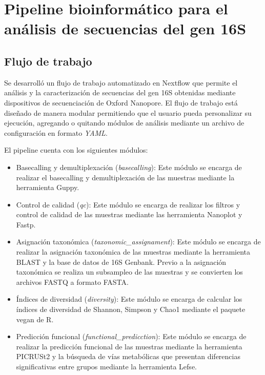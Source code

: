 \chapter{Pipeline bioinformático para el análisis de secuencias del gen 16S}

\section{Flujo de trabajo}
Se desarrolló un flujo de trabajo automatizado en Nextflow que permite el análisis y la caracterización de secuencias del gen 16S obtenidas mediante dispositivos de secuenciación de Oxford Nanopore. 
El flujo de trabajo está diseñado de manera modular permitiendo que el usuario pueda personalizar su ejecución, agregando o quitando módulos de análisis mediante un archivo de configuración en formato \textit{YAML}.  

El pipeline cuenta con los siguientes módulos: 
\begin{itemize}
    \item Basecalling y demultiplexación (\textit{basecalling}): Este módulo se encarga de realizar el basecalling y demultiplexación de las muestras mediante la herramienta Guppy.
    \item Control de calidad (\textit{qc}): Este módulo se encarga de realizar los filtros y control de calidad de las muestras mediante las herramienta Nanoplot y Fastp.
    \item Asignación taxonómica (\textit{taxonomic\_assignament}): Este módulo se encarga de realizar la asignación taxonómica de las muestras mediante la herramienta BLAST y la base de datos de 16S Genbank. Previo a la asignación taxonómica se realiza un subsampleo de las muestras y se convierten los archivos FASTQ a formato FASTA.
    \item Índices de diversidad (\textit{diversity}): Este módulo se encarga de calcular los índices de diversidad de Shannon, Simpson y Chao1 mediante el paquete vegan de R.
    \item Predicción funcional (\textit{functional\_predicction}): Este módulo se encarga de realizar la predicción funcional de las muestras mediante la herramienta PICRUSt2 y la búsqueda de vías metabólicas que presentan diferencias significativas entre grupos mediante la herramienta Lefse.
\end{itemize}


